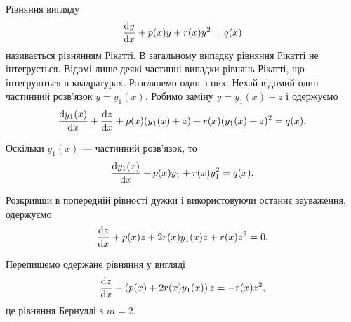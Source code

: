Рівняння вигляду 
\begin{equation*}
	\frac{\mathop{}\!\mathrm{d} y}{\mathop{}\!\mathrm{d} x} + p(x) y + r(x) y^2 = q(x)
\end{equation*} 
називається рівнянням Рікатті. В загальному випадку рівняння Рікатті не інтегрується. Відомі лише деякі частинні випадки рівнянь Рікатті, що інтегруються в квадратурах. Розглянемо один з них. Нехай відомий один частинний розв’язок $y = y_1(x)$. Робимо заміну $y = y_1(x) + z$ і одержуємо
\begin{equation*}
	\frac{\mathop{}\!\mathrm{d} y_1(x)}{\mathop{}\!\mathrm{d} x} + \frac{\mathop{}\!\mathrm{d} z}{\mathop{}\!\mathrm{d} x} + p(x) (y_1(x) + z) + r(x) (y_1(x) + z)^2 = q(x).
\end{equation*}

Оскільки $y_1(x)$ --- частинний розв’язок, то
\begin{equation*}
	\frac{\mathop{}\!\mathrm{d} y_1(x)}{\mathop{}\!\mathrm{d} x} + p(x) y_1 + r(x) y_1^2 = q(x).
\end{equation*}

Розкривши в попередній рівності дужки і використовуючи останнє зауваження, одержуємо
\begin{equation*}
	\frac{\mathop{}\!\mathrm{d} z}{\mathop{}\!\mathrm{d} x} + p(x) z + 2 r(x) y_1(x) z + r(x) z^2 = 0.
\end{equation*}

Перепишемо одержане рівняння у вигляді
\begin{equation*}
	\frac{\mathop{}\!\mathrm{d} z}{\mathop{}\!\mathrm{d} x} + \left(p(x) + 2 r(x) y_1(x)\right) z = - r(x) z^2 ,
\end{equation*}
це рівняння Бернуллі з $m = 2$.

